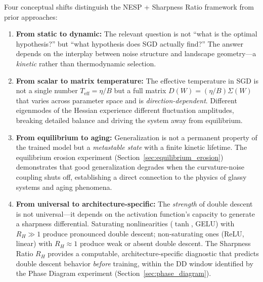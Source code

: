 \documentclass[
  journal=largetwo,
  simfonts=false,
  year=2025,
  volume=37,
]{cup-journal}
\begin{document}
Four conceptual shifts distinguish the NESP + Sharpness Ratio framework from prior approaches:

\begin{enumerate}
    \item \textbf{From static to dynamic:} The relevant question is not ``what is the optimal hypothesis?'' but ``what hypothesis does SGD actually find?'' The answer depends on the interplay between noise structure and landscape geometry---a \textit{kinetic} rather than thermodynamic selection.

    \item \textbf{From scalar to matrix temperature:} The effective temperature in SGD is not a single number $T_{\mathrm{eff}} = \eta/B$ but a full matrix $D(W) = (\eta/B)\Sigma(W)$ that varies across parameter space and is \textit{direction-dependent}. Different eigenmodes of the Hessian experience different fluctuation amplitudes, breaking detailed balance and driving the system away from equilibrium.

    \item \textbf{From equilibrium to aging:} Generalization is not a permanent property of the trained model but a \textit{metastable state} with a finite kinetic lifetime. The equilibrium erosion experiment (Section~\ref{sec:equilibrium_erosion}) demonstrates that good generalization degrades when the curvature-noise coupling shuts off, establishing a direct connection to the physics of glassy systems and aging phenomena.

    \item \textbf{From universal to architecture-specific:} The \textit{strength} of double descent is not universal---it depends on the activation function's capacity to generate a sharpness differential. Saturating nonlinearities ($\tanh$, GELU) with $R_H \gg 1$ produce pronounced double descent; non-saturating ones (ReLU, linear) with $R_H \approx 1$ produce weak or absent double descent. The Sharpness Ratio $R_H$ provides a computable, architecture-specific diagnostic that predicts double descent behavior \textit{before} training, within the DD window identified by the Phase Diagram experiment (Section~\ref{sec:phase_diagram}).
\end{enumerate}
\end{document}
